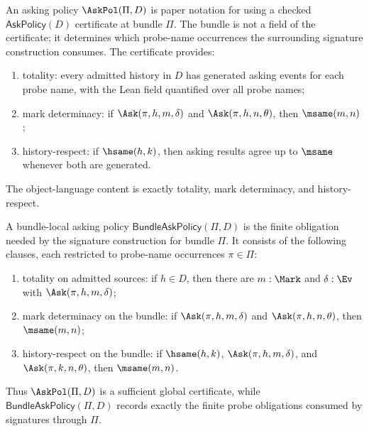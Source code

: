 \begin{definition}
\label{def:asking-policy}
An asking policy $\AskPol(\Pi,D)$ is paper notation for using a checked $\mathsf{AskPolicy}(D)$ certificate at bundle $\Pi$.
The bundle is not a field of the certificate; it determines which probe-name occurrences the surrounding signature construction consumes.
The certificate provides:
\begin{enumerate}
  \item totality: every admitted history in $D$ has generated asking events for each probe name, with the Lean field quantified over all probe names;
  \item mark determinacy: if $\Ask(\pi,h,m,\delta)$ and $\Ask(\pi,h,n,\theta)$, then $\msame(m,n)$;
  \item history-respect: if $\hsame(h,k)$, then asking results agree up to $\msame$ whenever both are generated.
\end{enumerate}
The object-language content is exactly totality, mark determinacy, and history-respect.
\end{definition}

\begin{definition}
\label{def:bundle-local-asking-policy}
A bundle-local asking policy $\mathsf{BundleAskPolicy}(\Pi,D)$ is the finite obligation needed by the signature construction for bundle $\Pi$. It consists of the following clauses, each restricted to probe-name occurrences $\pi\in\Pi$:
\begin{enumerate}
  \item totality on admitted sources: if $h\in D$, then there are $m:\Mark$ and $\delta:\Ev$ with $\Ask(\pi,h,m,\delta)$;
  \item mark determinacy on the bundle: if $\Ask(\pi,h,m,\delta)$ and $\Ask(\pi,h,n,\theta)$, then $\msame(m,n)$;
  \item history-respect on the bundle: if $\hsame(h,k)$, $\Ask(\pi,h,m,\delta)$, and $\Ask(\pi,k,n,\theta)$, then $\msame(m,n)$.
\end{enumerate}
Thus $\AskPol(\Pi,D)$ is a sufficient global certificate, while $\mathsf{BundleAskPolicy}(\Pi,D)$ records exactly the finite probe obligations consumed by signatures through $\Pi$.
\end{definition}

